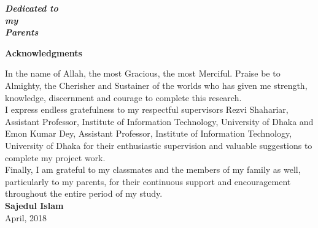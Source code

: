 \documentclass[12pt,a4 paper]{report}
\begin{document}
\newpage
\vspace*{7cm}
\begin{center}
\begin{large}
\LARGE \textbf{\textit{Dedicated to \vspace*{.7cm} \\ my \vspace{.35cm} \\ Parents}}
\end{large}
\end{center}

\newpage
 \vspace*{2cm}
\begin{center}
\begin{LARGE}
\textbf{Acknowledgments \\}
\end{LARGE}
\end{center}

In the name of Allah, the most Gracious, the most Merciful. Praise be to Almighty, the Cherisher and Sustainer of the worlds who has given me strength, knowledge, discernment and courage to complete this research.\\

I express endless gratefulness to my respectful supervisors Rezvi Shahariar, Assistant Professor, Institute of Information Technology, University of Dhaka and Emon Kumar Dey, Assistant Professor, Institute of Information Technology, University of Dhaka for their enthusiastic supervision and valuable suggestions to complete my project work.\\

Finally, I am grateful to my classmates and the members of my family as well, particularly to my parents, for their continuous support and encouragement throughout the entire period of my study.\\

\vspace*{2cm}
\noindent \textbf{Sajedul Islam} \\
\noindent April, 2018\\
\end{document}
